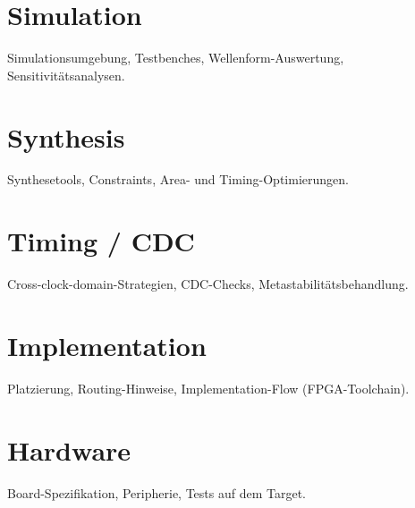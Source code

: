 \documentclass[12pt,a4paper,bibliography=totoc,listof=totoc]{scrartcl}
\begin{document}
\section{Simulation}
Simulationsumgebung, Testbenches, Wellenform-Auswertung, Sensitivitätsanalysen.

\section{Synthesis}
Synthesetools, Constraints, Area- und Timing-Optimierungen.

\section{Timing / CDC}
Cross-clock-domain-Strategien, CDC-Checks, Metastabilitätsbehandlung.

\section{Implementation}
Platzierung, Routing-Hinweise, Implementation-Flow (FPGA-Toolchain).

\section{Hardware}
Board-Spezifikation, Peripherie, Tests auf dem Target.

\pagebreak
\end{document}
